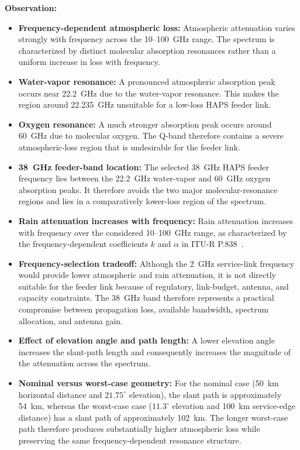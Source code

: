\documentclass[conference]{IEEEtran}
\begin{document}
\textbf{Observation:}
\begin{itemize}
    \item \textbf{Frequency-dependent atmospheric loss:}
    Atmospheric attenuation varies strongly with frequency across the 10--100~GHz range. The spectrum is characterized by distinct molecular absorption resonances rather than a uniform increase in loss with frequency.

    \item \textbf{Water-vapor resonance:}
    A pronounced atmospheric absorption peak occurs near 22.2~GHz due to the water-vapor resonance. This makes the region around 22.235~GHz unsuitable for a low-loss HAPS feeder link.

    \item \textbf{Oxygen resonance:}
    A much stronger absorption peak occurs around 60~GHz due to molecular oxygen. The Q-band therefore contains a severe atmospheric-loss region that is undesirable for the feeder link.

    \item \textbf{38~GHz feeder-band location:}
    The selected 38~GHz HAPS feeder frequency lies between the 22.2~GHz water-vapor and 60~GHz oxygen absorption peaks. It therefore avoids the two major molecular-resonance regions and lies in a comparatively lower-loss region of the spectrum.

    \item \textbf{Rain attenuation increases with frequency:}
    Rain attenuation increases with frequency over the considered 10--100~GHz range, as characterized by the frequency-dependent coefficients $k$ and $\alpha$ in ITU-R P.838~\cite{itu_p838}.

    \item \textbf{Frequency-selection tradeoff:}
    Although the 2~GHz service-link frequency would provide lower atmospheric and rain attenuation, it is not directly suitable for the feeder link because of regulatory, link-budget, antenna, and capacity constraints. The 38~GHz band therefore represents a practical compromise between propagation loss, available bandwidth, spectrum allocation, and antenna gain.

    \item \textbf{Effect of elevation angle and path length:}
    A lower elevation angle increases the slant-path length and consequently increases the magnitude of the attenuation across the spectrum.

    \item \textbf{Nominal versus worst-case geometry:}
    For the nominal case (50~km horizontal distance and $21.75^\circ$ elevation), the slant path is approximately 54~km, whereas the worst-case case ($11.3^\circ$ elevation and 100~km service-edge distance) has a slant path of approximately 102~km. The longer worst-case path therefore produces substantially higher atmospheric loss while preserving the same frequency-dependent resonance structure.


\end{itemize}
\end{document}
